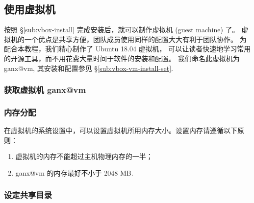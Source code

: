 \documentclass[
    11pt,
    cite=authoryear,
    device=normal,
    lang=cn,
    mode=simple,
    result=answer,
    toc=onecol,
]{elegantbook_sierxue}
\begin{document}

\subsection{使用虚拟机}%
\label{sub:vbox-vm}

按照 \S\ref{sub:vbox-install} 完成安装后，就可以制作虚拟机 (guest
machine) 了。
虚拟机的一个优点是共享方便，团队成员使用同样的配置大大有利于团队协作。
为配合本教程，我们精心制作了 Ubuntu 18.04 虚拟机，
可以让读者快速地学习常用的开源工具，而不用花费大量时间于软件的安装和配置。
我们命名此虚拟机为 ganx@vm, 其安装和配置参见 \S\ref{sub:vbox-vm-install-set}.


\subsubsection{获取虚拟机 ganx@vm}%
\label{ssub:vm-download}


\subsubsection{内存分配}%
\label{ssub:vbox-set-memory}

在虚拟机的系统设置中，可以设置虚拟机所用内存大小。设置内存请遵循以下原则：
\begin{enumerate}
    \item 虚拟机的内存不能超过主机物理内存的一半；
    \item ganx@vm 的内存最好不小于 2048 MB.
\end{enumerate}

\subsubsection{设定共享目录}%
\label{ssub:vbox-set-share-folder}
\end{document}
